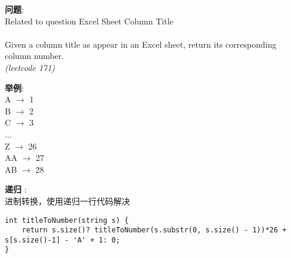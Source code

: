     
\begin{description}
    \item{\textbf{问题}}:\\
Related to question Excel Sheet Column Title\\
\\
Given a column title as appear in an Excel sheet, return its corresponding column number.\\
\textit{(leetcode 171)}
    \item{\textbf{举例}}:\\
    A $\rightarrow$ 1 \\
    B $\rightarrow$ 2 \\
    C $\rightarrow$ 3 \\
    ... \\
    Z $\rightarrow$ 26 \\
    AA $\rightarrow$ 27 \\
    AB $\rightarrow$ 28 
    \item{\textbf{递归}} : 
    \\进制转换，使用递归一行代码解决
    \begin{lstlisting}
int titleToNumber(string s) {
	return s.size()? titleToNumber(s.substr(0, s.size() - 1))*26 + s[s.size()-1] - 'A' + 1: 0;		
}
    \end{lstlisting}
\end{description}
